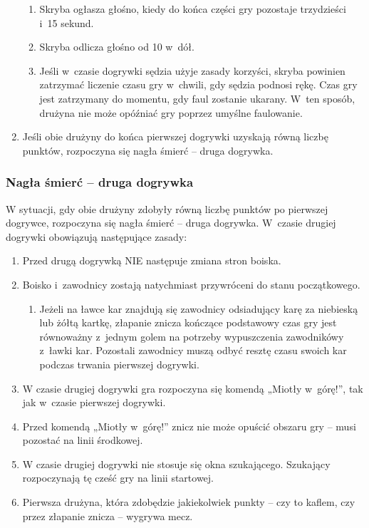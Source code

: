 \documentclass[12pt]{article}
\begin{document}
\begin{enumerate}
\begin{enumerate}
		      \item Skryba ogłasza głośno, kiedy do końca części gry pozostaje
		            trzydzieści i~15 sekund.

		      \item Skryba odlicza głośno od 10 w~dół.

		      \item Jeśli w~czasie dogrywki sędzia użyje zasady korzyści, skryba
		            powinien zatrzymać liczenie czasu gry w~chwili, gdy sędzia podnosi rękę.
		            Czas gry jest zatrzymany do momentu, gdy faul zostanie ukarany. W~ten
		            sposób, drużyna nie może opóźniać gry poprzez umyślne faulowanie.
	      \end{enumerate}

	\item Jeśli obie drużyny do końca pierwszej dogrywki uzyskają równą liczbę
	      punktów, rozpoczyna się nagła śmierć -- druga dogrywka.
\end{enumerate}

\subsubsection{Nagła śmierć -- druga dogrywka}
W sytuacji, gdy obie
drużyny zdobyły równą liczbę punktów po pierwszej dogrywce, rozpoczyna
się nagła śmierć -- druga dogrywka. W~czasie drugiej dogrywki obowiązują
następujące zasady:

\begin{enumerate}
	\item Przed drugą dogrywką NIE następuje zmiana stron boiska.

	\item Boisko i~zawodnicy zostają natychmiast przywróceni do stanu
	      początkowego.
	      \begin{enumerate}
		      \item Jeżeli na ławce kar znajdują się zawodnicy odsiadujący karę za
		            niebieską lub żółtą kartkę, złapanie znicza kończące podstawowy czas gry
		            jest równoważny z~jednym golem na potrzeby wypuszczenia zawodnikówy z~ławki kar. Pozostali zawodnicy muszą odbyć resztę czasu swoich kar
		            podczas trwania pierwszej dogrywki.
	      \end{enumerate}
	\item W czasie drugiej dogrywki gra rozpoczyna się komendą „Miotły w~górę!'', tak jak w~czasie pierwszej dogrywki.

	\item Przed komendą „Miotły w~górę!'' znicz nie może opuścić obszaru gry --
	      musi pozostać na linii środkowej.

	\item W czasie drugiej dogrywki nie stosuje się okna szukającego. Szukający
	      rozpoczynają tę cześć gry na linii startowej.

	\item Pierwsza drużyna, która zdobędzie jakiekolwiek punkty -- czy to
	      kaflem, czy przez złapanie znicza -- wygrywa mecz.
\end{enumerate}
\end{document}
